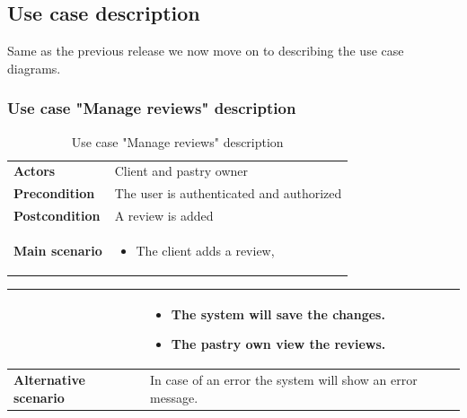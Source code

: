 \documentclass[12pt,a4paper]{report}
\begin{document}
	\subsection{Use case description}
	Same as the previous release we now move on to describing the use case diagrams.
	\subsubsection*{Use case "Manage reviews" description}
	\begin{table}[H]
		\begin{center}
			\captionsetup[table]{skip=10pt}
			\caption{Use case "Manage reviews" description}
			\setlength\doublerulesep{0.5pt}
			\begin{tabular}{|  p{5cm}|  p{9cm}|}
				\rowcolor{LightCyan}
				
				\hline
				\multicolumn{2}{c}{Use case "Manage reviews"}\\
				\hline
				
				\textbf{Actors} &                        
				Client and pastry owner 
				\\ \hline
				
				\textbf{Precondition} &                        
				The user is authenticated and authorized
				\\ \hline
				\textbf{Postcondition} &                        
				A review is added
				\\ \hline
				
				\textbf{Main scenario} &                   
				\begin{itemize}
					\item The client adds a review,
				\end{itemize}
				
				
				
				
			\end{tabular}
			
		\end{center}
		
	\end{table}
\begin{table}[H]
	\begin{center}
		
		\setlength\doublerulesep{0.5pt}
		\begin{tabular}{|  p{5cm}|  p{9cm}|}
		
			
			 &                   
			\begin{itemize}
				\item The system will save the changes.
				\item The pastry own view the reviews.
			\end{itemize}
			
			
			\\ \hline
			
			\textbf{Alternative scenario} &                        
			In case of an error the system will show an error message.
			\\ \hline
			
			
		\end{tabular}
		
	\end{center}
	
\end{table}
\end{document}

